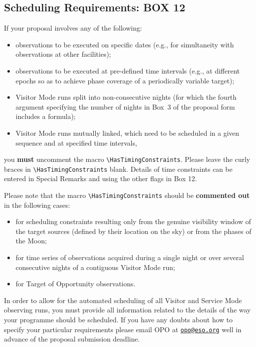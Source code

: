 \documentclass{article}
\begin{document}
\subsection{Scheduling Requirements: {\bf BOX 12}}
\label{sec:schedreq}
If your proposal involves any of the following:
\begin{itemize}
\item observations to be executed on specific dates (e.g., for
  simultaneity with observations at other facilities);
\item observations to be executed at pre-defined time intervals (e.g.,
  at different epochs so as to achieve phase coverage of a periodically
  variable target);
\item Visitor Mode runs split into non-consecutive nights (for which
  the fourth argument specifying the number of nights in Box~3 of the
  proposal form includes a formula);
\item Visitor Mode runs mutually linked, which need to be scheduled in
  a given sequence and at specified time intervals,
\end{itemize}
you {\bf must} uncomment the macro \verb|\HasTimingConstraints|.
Please leave the curly braces in \linebreak \verb|\HasTimingConstraints| blank.  Details of time
constraints can be entered in Special Remarks and using the other flags in Box 12.

Please note that the macro \verb|\HasTimingConstraints| should 
be {\bf commented out} in the following cases:
\begin{itemize}
\item for scheduling constraints resulting only from the genuine
  visibility window of the target sources (defined by their location
  on the sky) or from the phases of the Moon; 
\item for time series of observations acquired during a single night
  or over several consecutive nights of a contiguous Visitor Mode run; 
\item for Target of Opportunity observations.
\end{itemize} 

In order to allow for the automated scheduling of all
Visitor and Service Mode observing runs, you must provide all
information related to the details of the way your programme should be
scheduled.  If you have any doubts about how to specify your particular
requirements please email OPO at \href{mailto:opo@eso.org}{\tt opo@eso.org}
well in advance of the proposal submission deadline.
\end{document}
